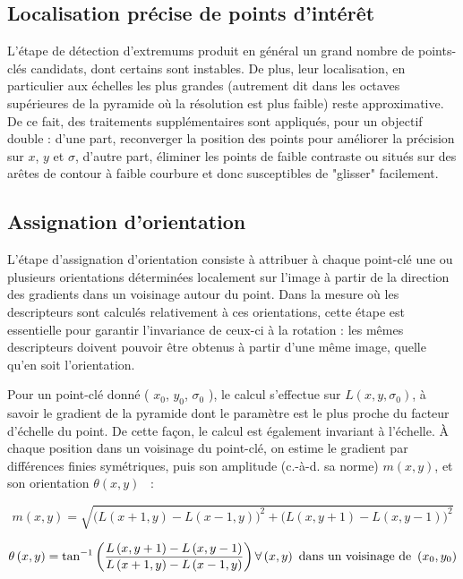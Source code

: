 \pagebreak
\subsection{Localisation précise de points d'intérêt}
L'étape de détection d'extremums produit en général un grand nombre de points-clés candidats, dont certains sont instables. De plus, leur localisation, en particulier aux échelles les plus grandes (autrement dit dans les octaves supérieures de la pyramide où la résolution est plus faible) reste approximative. De ce fait, des traitements supplémentaires sont appliqués, pour un objectif double : d'une part, reconverger la position des points pour améliorer la précision sur $x$, $y$ et $\sigma$, d'autre part, éliminer les points de faible contraste ou situés sur des arêtes de contour à faible courbure et donc susceptibles de "glisser" facilement.

\subsection{Assignation d'orientation}
L'étape d'assignation d'orientation consiste à attribuer à chaque point-clé une ou plusieurs orientations déterminées localement sur l'image à partir de la direction des gradients dans un voisinage autour du point. Dans la mesure où les descripteurs sont calculés relativement à ces orientations, cette étape est essentielle pour garantir l'invariance de ceux-ci à la rotation : les mêmes descripteurs doivent pouvoir être obtenus à partir d'une même image, quelle qu'en soit l'orientation\cite{low04}.

Pour un point-clé donné ( $x_0$, $y_0$, $\sigma_0$ ), le calcul s'effectue sur $L ( x, y, \sigma_0 )$, à savoir le gradient de la pyramide dont le paramètre est le plus proche du facteur d'échelle du point. De cette façon, le calcul est également invariant à l'échelle. À chaque position dans un voisinage du point-clé, on estime le gradient par différences finies symétriques, puis son amplitude (c.-à-d. sa norme) $m ( x, y )$, et son orientation $\theta ( x, y )$ \cite{low04}~:

\begin{equation}
m \left( x, y \right) = \sqrt{\bigl( L \left( x+1, y \right) - L \left( x-1, y \right) \bigr)^2 + \bigl( L \left( x, y+1 \right) - L \left( x, y-1 \right) \bigr)^2}
\end{equation}

\begin{equation}
\theta \left( x, y \right) = \tan^{-1}\left(\frac{L \left( x, y+1 \right) - L \left( x, y-1 \right)}{L \left( x+1, y \right) - L \left( x-1, y \right)} \right)
\forall\left(x, y\right) \hbox{ dans un voisinage de } \left(x_0, y_0\right)
\end{equation}

